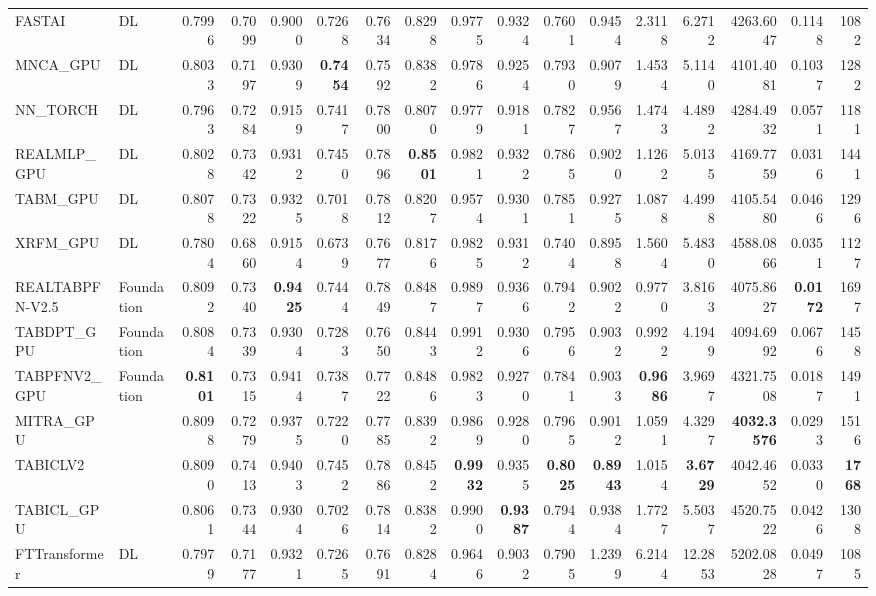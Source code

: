 \begin{table}[htbp]
{\begin{tabular}{ll|rrrrrrrrrrrrrr|r}
FASTAI & DL & 0.7996 & 0.7099 & 0.9000 & 0.7268 & 0.7634 & 0.8298 & 0.9775 & 0.9324 & 0.7601 & 0.9454 & 2.3118 & 6.2712 & 4263.6047 & 0.1148 & 1082 \\
MNCA\_GPU & DL & 0.8033 & 0.7197 & 0.9309 & \textbf{0.7454} & 0.7592 & 0.8382 & 0.9786 & 0.9254 & 0.7930 & 0.9079 & 1.4534 & 5.1140 & 4101.4081 & 0.1037 & 1282 \\
NN\_TORCH & DL & 0.7963 & 0.7284 & 0.9159 & 0.7417 & 0.7800 & 0.8070 & 0.9779 & 0.9181 & 0.7827 & 0.9567 & 1.4743 & 4.4892 & 4284.4932 & 0.0571 & 1181 \\
REALMLP\_GPU & DL & 0.8028 & 0.7342 & 0.9312 & 0.7450 & 0.7896 & \textbf{0.8501} & 0.9821 & 0.9322 & 0.7865 & 0.9020 & 1.1262 & 5.0135 & 4169.7759 & 0.0316 & 1441 \\
TABM\_GPU & DL & 0.8078 & 0.7322 & 0.9325 & 0.7018 & 0.7812 & 0.8207 & 0.9574 & 0.9301 & 0.7851 & 0.9275 & 1.0878 & 4.4998 & 4105.5480 & 0.0466 & 1296 \\
XRFM\_GPU & DL & 0.7804 & 0.6860 & 0.9154 & 0.6739 & 0.7677 & 0.8176 & 0.9825 & 0.9312 & 0.7404 & 0.8958 & 1.5604 & 5.4830 & 4588.0866 & 0.0351 & 1127 \\
REALTABPFN-V2.5 & Foundation & 0.8092 & 0.7340 & \textbf{0.9425} & 0.7444 & 0.7849 & 0.8487 & 0.9897 & 0.9366 & 0.7942 & 0.9022 & 0.9770 & 3.8163 & 4075.8627 & \textbf{0.0172} & 1697 \\
TABDPT\_GPU & Foundation & 0.8084 & 0.7339 & 0.9304 & 0.7283 & 0.7650 & 0.8443 & 0.9912 & 0.9306 & 0.7956 & 0.9032 & 0.9922 & 4.1949 & 4094.6992 & 0.0676 & 1458 \\
TABPFNV2\_GPU & Foundation & \textbf{0.8101} & 0.7315 & 0.9414 & 0.7387 & 0.7722 & 0.8486 & 0.9823 & 0.9270 & 0.7841 & 0.9033 & \textbf{0.9686} & 3.9697 & 4321.7508 & 0.0187 & 1491 \\
MITRA\_GPU &  & 0.8098 & 0.7279 & 0.9375 & 0.7220 & 0.7785 & 0.8392 & 0.9869 & 0.9280 & 0.7965 & 0.9012 & 1.0591 & 4.3297 & \textbf{4032.3576} & 0.0293 & 1516 \\
TABICLV2 &  & 0.8090 & 0.7413 & 0.9403 & 0.7452 & 0.7886 & 0.8452 & \textbf{0.9932} & 0.9355 & \textbf{0.8025} & \textbf{0.8943} & 1.0154 & \textbf{3.6729} & 4042.4652 & 0.0330 & \textbf{1768} \\
TABICL\_GPU &  & 0.8061 & 0.7344 & 0.9304 & 0.7026 & 0.7814 & 0.8382 & 0.9900 & \textbf{0.9387} & 0.7944 & 0.9384 & 1.7727 & 5.5037 & 4520.7522 & 0.0426 & 1308 \\
\midrule
FTTransformer & DL & 0.7979 & 0.7177 & 0.9321 & 0.7265 & 0.7691 & 0.8284 & 0.9646 & 0.9032 & 0.7905 & 1.2399 & 6.2144 & 12.2853 & 5202.0828 & 0.0497 & 1085 \\

\end{tabular}}
\end{table}
